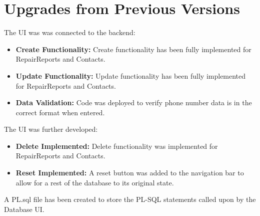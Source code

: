 \documentclass{article}
\begin{document}
\section{Upgrades from Previous Versions}

\vspace{0.2cm}
\begin{tcolorbox}[colback=secondarycolor, colframe=primarycolor, arc=5mm, title=\textbf{Step 4 --> Step 5}]
The UI was was connected to the backend:
\vspace{0.2cm}
\begin{itemize}
  \item \textbf{Create Functionality:} Create functionality has been fully implemented for RepairReports and Contacts.
  \vspace{0.1cm}
  \item \textbf{Update Functionality:} Update functionality has been fully implemented for RepairReports and Contacts.
  \vspace{0.1cm}
    \item \textbf{Data Validation:} Code was deployed to verify phone number data is in the correct format when entered.
  \vspace{0.1cm}
  \end{itemize}
\end{tcolorbox}

\vspace{1cm}
\begin{tcolorbox}[colback=secondarycolor, colframe=primarycolor, arc=5mm, title=\textbf{Step 3 --> Step 4}]
The UI was further developed:
\vspace{0.2cm}
\begin{itemize}
  \item \textbf{Delete Implemented:} Delete functionality was implemented for RepairReports and Contacts.
  \vspace{0.1cm}
  \item \textbf{Reset Implemented:} A reset button was added to the navigation bar to allow for a rest of the database to its original state.
  \vspace{0.1cm}
  \end{itemize}
\vspace{0.2cm}
A PL.sql file has been created to store the PL-SQL statements called upon by the Database UI.
\end{tcolorbox}
\end{document}
